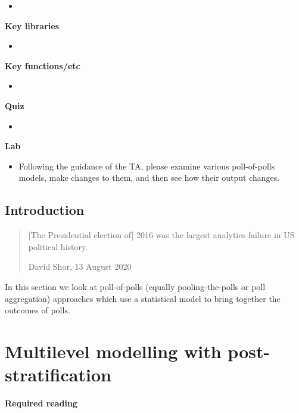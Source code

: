 \documentclass[
]{book}
\providecommand{\tightlist}{%
  \setlength{\itemsep}{0pt}\setlength{\parskip}{0pt}}
\begin{document}
\begin{itemize}
\item
\end{itemize}

\textbf{Key libraries}

\begin{itemize}
\item
\end{itemize}

\textbf{Key functions/etc}

\begin{itemize}
\item
\end{itemize}

\textbf{Quiz}

\begin{itemize}
\item
\end{itemize}

\textbf{Lab}

\begin{itemize}
\tightlist
\item
  Following the guidance of the TA, please examine various poll-of-polls models, make changes to them, and then see how their output changes.
\end{itemize}

\hypertarget{introduction-24}{%
\section{Introduction}\label{introduction-24}}

\begin{quote}
{[}The Presidential election of{]} 2016 was the largest analytics failure in US political history.

David Shor, 13 August 2020
\end{quote}

In this section we look at poll-of-polls (equally pooling-the-polls or poll aggregation) approaches which use a statistical model to bring together the outcomes of polls.

\hypertarget{multilevel-modelling-with-post-stratification}{%
\chapter{Multilevel modelling with post-stratification}\label{multilevel-modelling-with-post-stratification}}

\textbf{Required reading}
\end{document}
